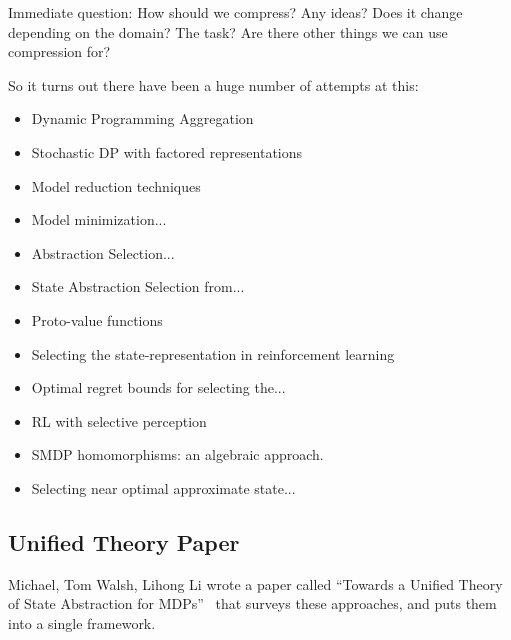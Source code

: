 \documentclass[11pt]{amsart}
\begin{document}
Immediate question: How should we compress? Any ideas? Does it change depending on the domain? The task? Are there other things we can use compression for?

So it turns out there have been a huge number of attempts at this:
\begin{itemize}
\item Dynamic Programming Aggregation
\item Stochastic DP with factored representations
\item Model reduction techniques
\item Model minimization...
\item Abstraction Selection...
\item State Abstraction Selection from...
\item Proto-value functions
\item Selecting the state-representation in reinforcement learning
\item Optimal regret bounds for selecting the...
\item RL with selective perception
\item SMDP homomorphisms: an algebraic approach.
\item Selecting near optimal approximate state...
\end{itemize}

\midline
\subsection{Unified Theory Paper}
Michael, Tom Walsh, Lihong Li wrote a paper called ``Towards a Unified Theory of State Abstraction for MDPs''~\cite{li2006towards} that surveys these approaches, and puts them into a single framework.
\end{document}
